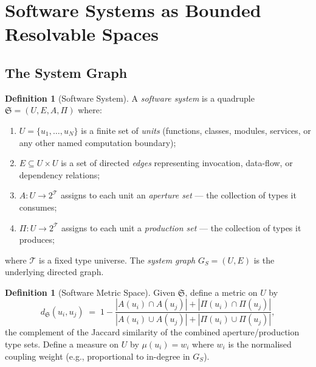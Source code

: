\documentclass[12pt,a4paper,twocolumn]{article}
\theoremstyle{plain}
\theoremstyle{definition}
\newtheorem{definition}[theorem]{Definition}
\theoremstyle{remark}
\newcommand{\GS}{G_S}
\begin{document}
\section{Software Systems as Bounded Resolvable Spaces}
\label{sec:software}

\subsection{The System Graph}

\begin{definition}[Software System]
\label{def:software-system}
A \emph{software system} is a quadruple $\mathfrak{S} = (U, E, A, \Pi)$
where:
\begin{enumerate}[label=(\roman*)]
  \item $U = \{u_1, \ldots, u_N\}$ is a finite set of \emph{units} (functions,
    classes, modules, services, or any other named computation boundary);
  \item $E \subseteq U \times U$ is a set of directed \emph{edges}
    representing invocation, data-flow, or dependency relations;
  \item $A : U \to 2^\mathcal{T}$ assigns to each unit an \emph{aperture set}
    --- the collection of types it consumes;
  \item $\Pi : U \to 2^\mathcal{T}$ assigns to each unit a
    \emph{production set} --- the collection of types it produces;
\end{enumerate}
where $\mathcal{T}$ is a fixed type universe.  The \emph{system graph}
$\GS = (U, E)$ is the underlying directed graph.
\end{definition}

\begin{definition}[Software Metric Space]
\label{def:software-metric}
Given $\mathfrak{S}$, define a metric on $U$ by
\begin{equation}
  d_\mathfrak{S}(u_i, u_j) \;=\;
    1 - \frac{|A(u_i) \cap A(u_j)| + |\Pi(u_i) \cap \Pi(u_j)|}
             {|A(u_i) \cup A(u_j)| + |\Pi(u_i) \cup \Pi(u_j)|},
\end{equation}
the complement of the Jaccard similarity of the combined aperture/production
type sets.  Define a measure on $U$ by $\mu(u_i) = w_i$ where $w_i$ is the
normalised coupling weight (e.g., proportional to in-degree in $\GS$).
\end{definition}
\end{document}
